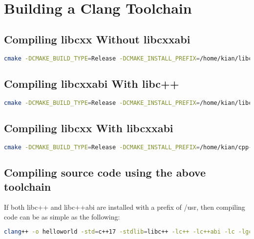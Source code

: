 \section{Building a Clang Toolchain}



\subsection{Compiling libcxx Without libcxxabi}
\begin{lstlisting}[language=bash]
cmake -DCMAKE_BUILD_TYPE=Release -DCMAKE_INSTALL_PREFIX=/home/kian/libc++ -DCMAKE_CXX_COMPILER=clang++ -DCMAKE_CXX_FLAGS="-std=c++17" ../libcxx
\end{lstlisting}

\subsection{Compiling libcxxabi With libc++}
\begin{lstlisting}[language=bash]
cmake -DCMAKE_BUILD_TYPE=Release -DCMAKE_INSTALL_PREFIX=/home/kian/libc++abi -DCMAKE_CXX_COMPILER=clang++ -DCMAKE_CXX_FLAGS="-std=c++17 -I/home/kian/libc++/include" -DLIBCXXABI_LIBCXX_INCLUDES=/home/kian/libc++/include/c++/v1 ../libcxxabi/
\end{lstlisting}

\subsection{Compiling libcxx With libcxxabi}
\begin{lstlisting}[language=bash]
cmake -DCMAKE_BUILD_TYPE=Release -DCMAKE_INSTALL_PREFIX=/home/kian/cpp-toolchain/libc++ -DCMAKE_CXX_COMPILER=clang++ -DCMAKE_CXX_FLAGS="-std=c++17" -DLIBCXX_CXX_ABI=libcxxabi -DLIBCXX_CXX_ABI_LIBRARY_PATH=/home/kian/libc++abi/lib -DLIBCXX_CXX_ABI_INCLUDE_PATHS=../libcxxabi/include ../libcxx
\end{lstlisting}

\subsection{Compiling source code using the above toolchain}
If both libc++ and libc++abi are installed with a prefix of /usr, then compiling code can be as simple as the following:

\begin{lstlisting}[language=bash]
clang++ -o helloworld -std=c++17 -stdlib=libc++ -lc++ -lc++abi -lc -lgcc_s main.cpp
\end{lstlisting}

